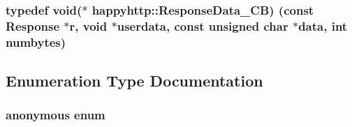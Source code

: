 \subsubsection[{\texorpdfstring{Response\+Data\+\_\+\+CB}{ResponseData_CB}}]{\setlength{\rightskip}{0pt plus 5cm}typedef void($\ast$ happyhttp\+::\+Response\+Data\+\_\+\+CB) (const {\bf Response} $\ast$r, void $\ast$userdata, const unsigned char $\ast$data, int numbytes)}\hypertarget{namespacehappyhttp_a818d88091992f5d95f2c53708511fd49}{}\label{namespacehappyhttp_a818d88091992f5d95f2c53708511fd49}


\subsection{Enumeration Type Documentation}
\subsubsection[{\texorpdfstring{anonymous enum}{anonymous enum}}]{\setlength{\rightskip}{0pt plus 5cm}anonymous enum}\hypertarget{namespacehappyhttp_aa3b9ad683b0ddfdd10b65b3fcfbd6251}{}\label{namespacehappyhttp_aa3b9ad683b0ddfdd10b65b3fcfbd6251}
